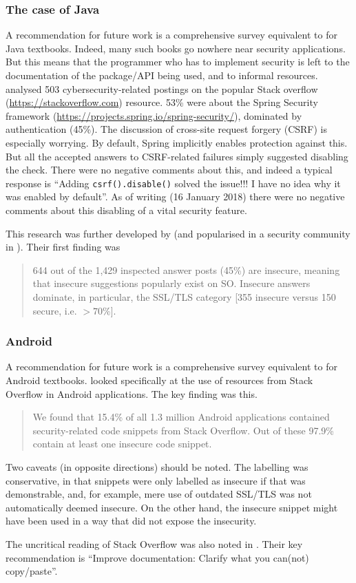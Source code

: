 \documentclass[conference]{IEEEtran}
\begin{document}
\subsubsection{The case of Java}\label{sec:Java}
A recommendation for future work is a comprehensive survey equivalent to \cite{Drop2019} for  Java textbooks. Indeed, many such books go nowhere near security applications.  But this means that the programmer who has to implement security is left to the documentation of the package/API being used, and to informal resources. \cite{Mengetal2018a} analysed 503 cybersecurity-related postings on the popular Stack overflow (\url{https://stackoverflow.com}) resource.  53\% were about the Spring Security framework (\url{https://projects.spring.io/spring-security/}), dominated by authentication (45\%). The discussion \cite[\S4.3.1]{Mengetal2018a} of cross-site request forgery (CSRF) is especially worrying.  By default, Spring implicitly enables protection against this. But all the accepted answers to CSRF-related failures simply suggested disabling the check. There were no negative comments about this, and indeed a typical response is ``Adding \verb!csrf().disable()!
solved the issue!!! I have no idea why it was enabled by default''. As of writing (16 January 2018) there were no negative comments about this disabling of a vital security feature.
\par
This research was further developed by \cite{Chenetal2019a}  (and popularised in a security community in \cite{Zorz2019a}). Their first finding was
\begin{quote}
644 out of the 1,429 inspected answer posts
(45\%) are insecure, meaning that insecure suggestions
popularly exist on SO. Insecure answers dominate, in
particular, the SSL/TLS category [355 insecure versus 150 secure, i.e. $>70$\%].
\end{quote} 

\subsubsection{Android}\label{sec:Android}
A recommendation for future work is a comprehensive survey equivalent to \cite{Drop2019} for Android textbooks. \cite{Fischeretal2017a} looked specifically at the use of resources from Stack Overflow in Android applications. The key finding was this.
\begin{quote}
We found that 15.4\% of all 1.3 million Android applications
contained security-related code snippets from
Stack Overflow. Out of these 97.9\% contain at least one
insecure code snippet.
\end{quote}
Two caveats (in opposite directions) should be noted. The labelling was conservative, in that snippets were only labelled as insecure if that was demonstrable, and, for example, mere use of outdated SSL/TLS was not automatically deemed insecure. On the other hand, the insecure snippet might have been used in a way that did not expose the insecurity.
\par
The uncritical reading of Stack Overflow was also noted in \cite[Slide 29]{Votipkaetal2019a}. Their key recommendation  \cite[Slide 32]{Votipkaetal2019a} is ``Improve documentation: Clarify what you can(not) copy/paste''. 
\end{document}
